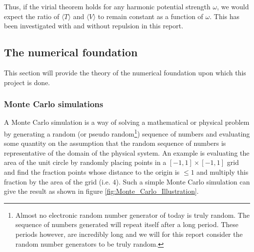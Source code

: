 Thus, if the virial theorem holds for any harmonic potential strength $\omega$, we would expect the ratio of $\langle T \rangle$ and $\langle V \rangle$ to remain constant as a function of $\omega$. 
This has been investigated with and without repulsion in this report. 





































\subsection{The numerical foundation}
This section will provide the theory of the numerical foundation upon which this project is done. 

\subsubsection{Monte Carlo simulations}
A Monte Carlo simulation is a way of solving a mathematical or physical problem by generating a random
(or pseudo random\footnote
{Almost no electronic random number generator of today is truly random. 
The sequence of numbers generated will repeat itself after a long period. 
These periods however, are incredibly long and we will for this report 
consider the random number generators to be truly random.})
sequence of numbers and evaluating some quantity on the assumption that the random sequence of numbers is representative of the domain of the physical system.
An example is evaluating the area of the unit circle by randomly placing points in a $[-1,1] \times [-1,1] $ grid and find the fraction points whose distance to the origin is $\leq 1$ and multiply this fraction by the area of the grid (i.e. $4$).
Such a simple Monte Carlo simulation can give the result as shown in figure \ref{fig:Monte_Carlo_Illustration}.

